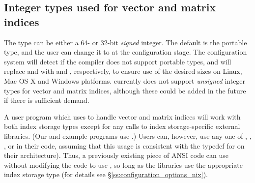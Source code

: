 \subsection{Integer types used for vector and matrix indices}

The type  can be either a 64- or 32-bit \emph{signed} integer.
The default is the portable  type, and the user can change it
to  at the configuration stage. The configuration system
will detect if the compiler does not support portable types, and will
replace  and  with  and ,
respectively, to ensure use of the desired sizes on Linux, Mac OS X and Windows
platforms. {\sundials} currently does not support \emph{unsigned} integer types 
for vector and matrix indices, although these could be added in the future if there 
is sufficient demand.

A user program which uses  to handle vector and matrix indices
will work with both index storage types except for any calls to index storage-specific
external libraries. (Our  and  example programs use .)
Users can, however, use any one of , , ,  or
 in their code, assuming that this usage is consistent with the typedef
for  on their architecture). Thus, a previously existing piece of ANSI
{\CC} code can use {\sundials} without modifying the code to use ,
so long as the {\sundials} libraries use the appropriate index storage type (for details
see \S\ref{ss:configuration_options_nix}).
